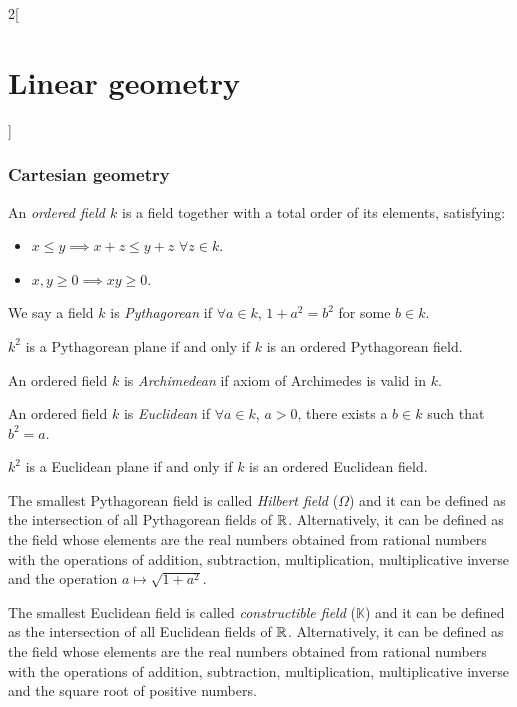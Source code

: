 \documentclass[../../../main.tex]{subfiles}
\begin{document}
\begin{multicols}{2}[\section{Linear geometry}]
\subsubsection*{Cartesian geometry}
\begin{definition}
An \textit{ordered field $k$} is a field together with a total order of its elements, satisfying:
\begin{itemize}
    \item $x\leq y\implies x+z\leq y+z$ $\forall z\in k$.
    \item $x,y\geq 0\implies xy\geq 0$.
\end{itemize}
\end{definition}
\begin{definition}
We say a field $k$ is \textit{Pythagorean} if $\forall a\in k$, $1+a^2=b^2$ for some $b\in k$.
\end{definition}
\begin{theorem}
$k^2$ is a Pythagorean plane if and only if $k$ is an ordered Pythagorean field.
\end{theorem}
\begin{definition}
An ordered field $k$ is \textit{Archimedean} if axiom of Archimedes is valid in $k$.
\end{definition}
\begin{definition}
An ordered field $k$ is \textit{Euclidean} if $\forall a\in k$, $a>0$, there exists a $b\in k$ such that $b^2=a$.
\end{definition}
\begin{theorem}
$k^2$ is a Euclidean plane if and only if $k$ is an ordered Euclidean field.
\end{theorem}
\begin{definition}
The smallest Pythagorean field is called \textit{Hilbert field} ($\Omega$) and it can be defined as the intersection of all Pythagorean fields of $\mathbb{R} $. Alternatively, it can be defined as the field whose elements are the real numbers obtained from rational numbers with the operations of addition, subtraction, multiplication, multiplicative inverse and the operation $a\mapsto\sqrt{1+a^2}$.
\end{definition}
\begin{definition}
The smallest Euclidean field is called \textit{constructible field} ($\mathbb{K}$) and it can be defined as the intersection of all Euclidean fields of $\mathbb{R} $. Alternatively, it can be defined as the field whose elements are the real numbers obtained from rational numbers with the operations of addition, subtraction, multiplication, multiplicative inverse and the square root of positive numbers.
\end{definition}

\end{multicols}
\end{document}
